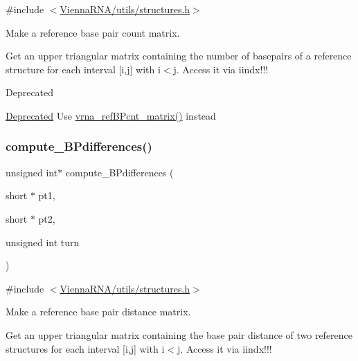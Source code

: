 {\ttfamily \#include $<$\hyperlink{utils_2structures_8h}{Vienna\+R\+N\+A/utils/structures.\+h}$>$}



Make a reference base pair count matrix. 

Get an upper triangular matrix containing the number of basepairs of a reference structure for each interval \mbox{[}i,j\mbox{]} with i$<$j. Access it via iindx!!!

\begin{DoxyRefDesc}{Deprecated}
\item[\hyperlink{deprecated__deprecated000190}{Deprecated}]Use \hyperlink{group__struct__utils_gab4c2a00c99ce1d612ffa5bde114eb96d}{vrna\+\_\+ref\+B\+Pcnt\+\_\+matrix()} instead\end{DoxyRefDesc}
\mbox{\label{group__struct__utils__deprecated_gadd463184355d0803b6ee6e09f29182f2}} 
\subsubsection{\texorpdfstring{compute\+\_\+\+B\+Pdifferences()}{compute\_BPdifferences()}}
{\footnotesize\ttfamily unsigned int$\ast$ compute\+\_\+\+B\+Pdifferences (\begin{DoxyParamCaption}\item[{short $\ast$}]{pt1,  }\item[{short $\ast$}]{pt2,  }\item[{unsigned int}]{turn }\end{DoxyParamCaption})}



{\ttfamily \#include $<$\hyperlink{utils_2structures_8h}{Vienna\+R\+N\+A/utils/structures.\+h}$>$}



Make a reference base pair distance matrix. 

Get an upper triangular matrix containing the base pair distance of two reference structures for each interval \mbox{[}i,j\mbox{]} with i$<$j. Access it via iindx!!!

